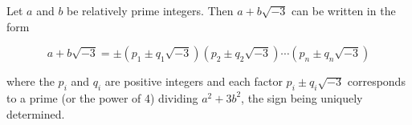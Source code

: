 Let $a$ and $b$ be relatively prime integers. Then $a + b\sqrt{-3}$ can be written in the form

$$a + b\sqrt{-3} = \pm (p_1 \pm q_1\sqrt{-3})(p_2 \pm q_2\sqrt{-3}) \cdots (p_n \pm q_n\sqrt{-3})$$

where the $p_i$ and $q_i$ are positive integers and each factor $p_i \pm q_i\sqrt{-3}$ corresponds to a prime (or the power of 4) dividing $a^2 + 3b^2$, the sign being uniquely determined.
